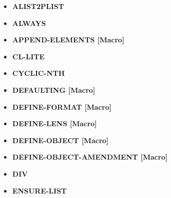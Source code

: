 \documentclass [11pt]{book}
\begin{document}
\begin{itemize}

\item {}
\textbf{ALIST2PLIST}





\item {}
\textbf{ALWAYS}





\item {}
\textbf{APPEND-ELEMENTS [Macro]}





\item {}
\textbf{CL-LITE}





\item {}
\textbf{CYCLIC-NTH}





\item {}
\textbf{DEFAULTING [Macro]}





\item {}
\textbf{DEFINE-FORMAT [Macro]}





\item {}
\textbf{DEFINE-LENS [Macro]}





\item {}
\textbf{DEFINE-OBJECT [Macro]}





\item {}
\textbf{DEFINE-OBJECT-AMENDMENT [Macro]}





\item {}
\textbf{DIV}





\item {}
\textbf{ENSURE-LIST}






\end{itemize}
\end{document}
